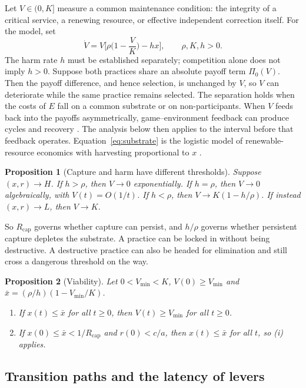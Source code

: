 \documentclass[11pt]{article}
\theoremstyle{plain}
\newtheorem{proposition}{Proposition}
\theoremstyle{definition}
\newcommand{\Rcap}{R_{\mathrm{cap}}}
\newcommand{\Vmin}{V_{\min}}
\begin{document}
Let $V\in(0,K]$ measure a common maintenance condition: the integrity of a critical service, a renewing resource, or effective independent correction itself. For the model, set
\begin{equation}\label{eq:substrate}
\dot V=V\Big[\rho\Big(1-\frac VK\Big)-hx\Big],\qquad \rho,K,h>0 .
\end{equation}
The harm rate $h$ must be established separately; competition alone does not imply $h>0$. Suppose both practices share an absolute payoff term $\Pi_0(V)$. Then the payoff difference, and hence selection, is unchanged by $V$, so $V$ can deteriorate while the same practice remains selected. The separation holds when the costs of $E$ fall on a common substrate or on non-participants. When $V$ feeds back into the payoffs asymmetrically, game--environment feedback can produce cycles and recovery \citep{weitz2016,tilman2020}. The analysis below then applies to the interval before that feedback operates. Equation~\eqref{eq:substrate} is the logistic model of renewable-resource economics with harvesting proportional to $x$ \citep{clark1990}.

\begin{proposition}[Capture and harm have different thresholds]\label{prop:substrate}
Suppose $(x,r)\to H$. If $h>\rho$, then $V\to0$ exponentially. If $h=\rho$, then $V\to0$ algebraically, with $V(t)=O(1/t)$. If $h<\rho$, then $V\to K(1-h/\rho)$. If instead $(x,r)\to L$, then $V\to K$.
\end{proposition}

So $\Rcap$ governs whether capture can persist, and $h/\rho$ governs whether persistent capture depletes the substrate. A practice can be locked in without being destructive. A destructive practice can also be headed for elimination and still cross a dangerous threshold on the way.

\begin{proposition}[Viability]\label{prop:viability}
Let $0<\Vmin<K$, $V(0)\ge\Vmin$ and $\bar x=(\rho/h)(1-\Vmin/K)$.
\begin{enumerate}[label=(\roman*),leftmargin=*]
\item If $x(t)\le\bar x$ for all $t\ge0$, then $V(t)\ge\Vmin$ for all $t\ge0$.
\item If $x(0)\le\bar x<1/\Rcap$ and $r(0)<c/a$, then $x(t)\le\bar x$ for all $t$, so (i) applies.
\end{enumerate}
\end{proposition}

\subsection{Transition paths and the latency of levers}
\end{document}
